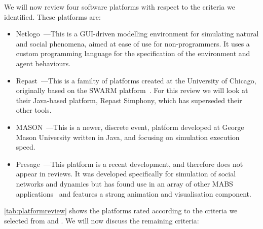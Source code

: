 We will now review four software platforms with respect to the criteria we identified. These platforms are:
\begin{itemize}
\item Netlogo~\citep{Wilensky1999a}---This is a \ac{GUI}-driven modelling environment for simulating natural and social phenomena, aimed at ease of use for non-programmers. It uses a custom programming language for the specification of the environment and agent behaviours.
\item Repast~\citep{Collier2009}---This is a familty of platforms created at the University of Chicago, originally based on the SWARM platform~\citep{Minar1996}. For this review we will look at their Java-based platform, Repast Simphony, which has superseded their other tools.
\item MASON~\citep{Luke2005}---This is a newer, discrete event, platform developed at George Mason University written in Java, and focusing on simulation execution speed.
\item Presage~\citep{Neville:2009}---This platform is a recent development, and therefore does not appear in reviews. It was developed specifically for simulation of social networks and dynamics but has found use in an array of other \ac{MABS} applications~\citep{Pitt2011,Carr2012} and features a strong animation and visualisation component.
\end{itemize}


\autoref{tab:platformreview} shows the platforms rated according to the criteria we selected from \citet{CynthiaNikolaiandGregoryMadey2009} and \citet{Castle2006}. We will now discuss the remaining criteria:

